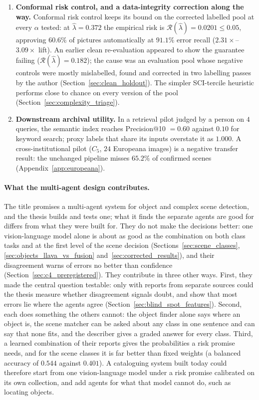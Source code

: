 \documentclass[12pt,a4paper]{report}
\begin{document}
\begin{enumerate}
    \item \textbf{Conformal risk control, and a data-integrity correction along the way.} Conformal risk control \cite{crc2024} keeps its bound on the corrected labelled pool at every $\alpha$ tested: at $\hat{\lambda}=0.372$ the empirical risk is $\mathcal{R}(\hat{\lambda})=0.0201 \le 0.05$, approving $60.6\%$ of pictures automatically at $91.1\%$ error recall ($2.31\times$--$3.09\times$ lift). An earlier clean re-evaluation appeared to show the guarantee failing ($\mathcal{R}(\hat\lambda)=0.182$); the cause was an evaluation pool whose negative controls were mostly mislabelled, found and corrected in two labelling passes by the author (Section~\ref{sec:clean_holdout}). The simpler SCI-tercile heuristic performs close to chance on every version of the pool (Section~\ref{sec:complexity_triage}).
    \item \textbf{Downstream archival utility.} In a retrieval pilot judged by a person on $4$ queries, the semantic index reaches Precision@10 $=0.60$ against $0.10$ for keyword search; proxy labels that share its inputs overstate it as $1.000$. A cross-institutional pilot ($C_5$, $24$ Europeana images) is a negative transfer result: the unchanged pipeline misses $65.2\%$ of confirmed scenes (Appendix~\ref{app:europeana}).
\end{enumerate}

\paragraph{What the multi-agent design contributes.} The title promises a multi-agent system for object and complex scene detection, and the thesis builds and tests one; what it finds the separate agents are good for differs from what they were built for. They do not make the decisions better: one vision-language model alone is about as good as the combination on both class tasks and at the first level of the scene decision (Sections~\ref{sec:scene_classes}, \ref{sec:objects_llava_vs_fusion} and~\ref{sec:corrected_results}), and their disagreement warns of errors no better than confidence (Section~\ref{sec:c4_preregistered}). They contribute in three other ways. First, they made the central question testable: only with reports from separate sources could the thesis measure whether disagreement signals doubt, and show that most errors lie where the agents agree (Section~\ref{sec:blind_spot_features}). Second, each does something the others cannot: the object finder alone says where an object is, the scene matcher can be asked about any class in one sentence and can say that none fits, and the describer gives a graded answer for every class. Third, a learned combination of their reports gives the probabilities a risk promise needs, and for the scene classes it is far better than fixed weights (a balanced accuracy of $0.544$ against $0.401$). A cataloguing system built today could therefore start from one vision-language model under a risk promise calibrated on its own collection, and add agents for what that model cannot do, such as locating objects.
\end{document}
